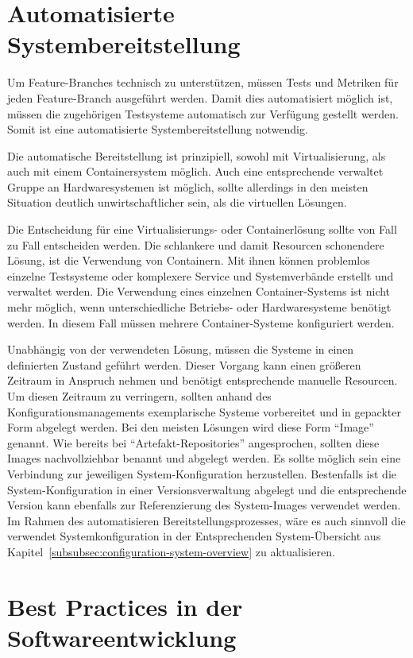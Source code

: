 \section{Automatisierte Systembereitstellung}

Um Feature-Branches technisch zu unterstützen, müssen Tests und Metriken für jeden Feature-Branch ausgeführt werden. Damit dies automatisiert möglich ist, müssen die zugehörigen Testsysteme automatisch zur Verfügung gestellt werden. Somit ist eine automatisierte Systembereitstellung notwendig.

Die automatische Bereitstellung ist prinzipiell, sowohl mit Virtualisierung, als auch mit einem Containersystem möglich. Auch eine entsprechende verwaltet Gruppe an Hardwaresystemen ist möglich, sollte allerdings in den meisten Situation deutlich unwirtschaftlicher sein, als die virtuellen Lösungen.

Die Entscheidung für eine Virtualisierungs- oder Containerlösung sollte von Fall zu Fall entscheiden werden. Die schlankere und damit Resourcen schonendere Lösung, ist die Verwendung von Containern. Mit ihnen können problemlos einzelne Testsysteme oder komplexere Service und Systemverbände erstellt und verwaltet werden. Die Verwendung eines einzelnen Container-Systems ist nicht mehr möglich, wenn unterschiedliche Betriebs- oder Hardwaresysteme benötigt werden. In diesem Fall müssen mehrere Container-Systeme konfiguriert werden.

Unabhängig von der verwendeten Lösung, müssen die Systeme in einen definierten Zustand geführt werden. Dieser Vorgang kann einen größeren Zeitraum in Anspruch nehmen und benötigt entsprechende manuelle Resourcen. Um diesen Zeitraum zu verringern, sollten anhand des Konfigurationsmanagements exemplarische Systeme vorbereitet und in gepackter Form abgelegt werden. Bei den meisten Lösungen wird diese Form ``Image'' genannt. Wie bereits bei ``Artefakt-Repositories'' angesprochen, sollten diese Images nachvollziehbar benannt und abgelegt werden. Es sollte möglich sein eine Verbindung zur jeweiligen System-Konfiguration herzustellen. Bestenfalls ist die System-Konfiguration in einer Versionsverwaltung abgelegt und die entsprechende Version kann ebenfalls zur Referenzierung des System-Images verwendet werden. Im Rahmen des automatisieren Bereitstellungsprozesses, wäre es auch sinnvoll die verwendet Systemkonfiguration in der Entsprechenden System-Übersicht aus Kapitel~\ref{subsubsec:configuration-system-overview} zu aktualisieren.

\section{Best Practices in der Softwareentwicklung}

